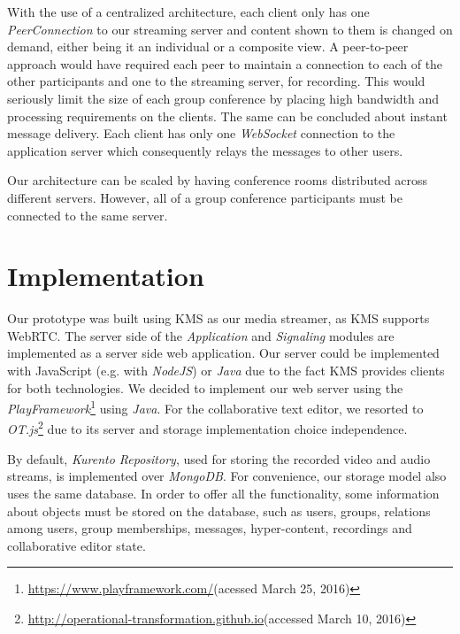 \documentclass[10pt,conference]{IEEEtran}
\begin{document}
With the use of a centralized architecture, each client only has one \emph{PeerConnection} to our streaming server and content shown to them is changed on demand, either being it an individual or a composite view. 
A peer-to-peer approach would have required each peer to maintain a connection to each of the other participants and one to the streaming server, for recording.
This would seriously limit the size of each group conference by placing high bandwidth and processing requirements on the clients. 
The same can be concluded about instant message delivery.
Each client has only one \emph{WebSocket} connection to the application server which consequently relays the messages to other users.

Our architecture can be scaled by having conference rooms distributed across different servers.
However, all of a group conference participants must be connected to the same server.


\section{Implementation}
\label{chapter:implementation}


Our prototype was built using \gls{KMS} as our media streamer, as \gls{KMS} supports \gls{WebRTC}.
The server side of the \emph{Application} and \emph{Signaling} modules are implemented as a server side web application. 
Our server could be implemented with JavaScript (e.g. with \emph{NodeJS}) or \emph{Java} due to the fact \gls{KMS} provides clients for both technologies. 
We decided to implement our web server using the \emph{PlayFramework}\footnote{\url{https://www.playframework.com/}(acessed March 25, 2016)} using \emph{Java}.
For the collaborative text editor, we resorted to \emph{OT.js}\footnote{\url{http://operational-transformation.github.io}(accessed March 10, 2016)} due to its server and storage implementation choice independence.

By default, \emph{Kurento Repository}, used for storing the recorded video and audio streams, is implemented over \emph{MongoDB}.
For convenience, our storage model also uses the same database.
In order to offer all the functionality, some information about objects must be stored on the database, such as users, groups, relations among users, group memberships, messages, hyper-content, recordings and collaborative editor state. 

\end{document}
